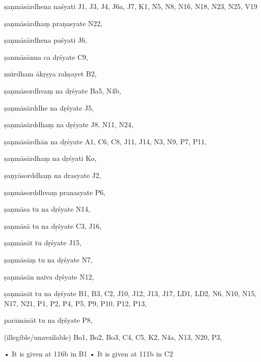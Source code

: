 \begin{marma}[hp03_081]


\item[ṣaṇmāsārdhena naśyati] J1, J3, J4, J6a, J7, K1, N5, N8, N16, N18, N23, N25, V19
\item[ṣaṇmāsārdhaṃ praṇasyate] N22,
\item[ṣaṇmāsārdhena paśyati] J6,
\item[ṣanmāsānna ca  dṛśyate] C9,
\item[mūrdham ākṛṣya rakṣayet] B2,
\item[ṣaṇmāsordhvaṃ na dṛśyate] Ba5, N4b,
\item[ṣaṇmāsārddhe na dṛśyate] J5,
\item[ṣaṇmāsārddhaṃ na dṛśyate] J8, N11, N24, 
\item[ṣaṇmāsārdhān na dṛśyate] A1, C6, C8, J11, J14, N3, N9, P7, P11, 
\item[ṣaṇmāsārdhaṃ na dṛśyati] Ko,
\item[ṣaṇyāsorddhaṃ na drasyate] J2,
\item[ṣaṇmāsorddhvaṃ pranasyate] P6,
\item[ṣaṇmāsa tu na dṛśyate] N14,
\item[ṣaṇmāsā tu na dṛśyate] C3, J16, 
\item[ṣaṇmāsāt tu dṛśyate] J15,
\item[ṣaṇmāsāṃ tu na dṛśyate] N7,
\item[ṣaṇmāsān naiva dṛśyate] N12,
\item[ṣaṇmāsāt tu na dṛśyate] B1, B3, C2, J10, J12, J13, J17, LD1, LD2, N6, N10, N15, N17, N21, P1, P2, P4, P5, P9, P10, P12, P13, 
\item[parāmāsāt tu na dṛśyate] P8,
\item[(illegible/unavailable)] Bo1, Bo2, Bo3, C4, C5, K2, N4a, N13, N20, P3,

  \begin{description}
    • It is given at 116b in B1
    • It is given at 111b in C2
  \end{description}

\end{marma}

